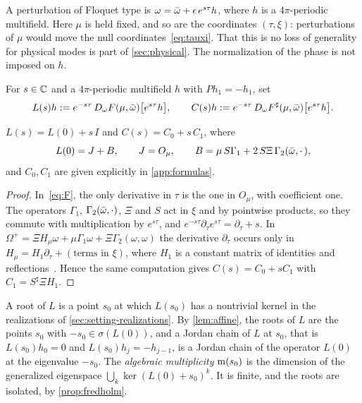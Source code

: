 A perturbation of Floquet type is $\omega=\bar\omega+\epsilon\,e^{s\tau}h$, where $h$ is a $4\pi$-periodic
multifield. Here $\mu$ is held fixed, and so are the coordinates $(\tau,\xi)$: perturbations of $\mu$ would
move the null coordinates~\eqref{eq:tauxi}. That this is no loss of generality for physical modes is part
of \cref{sec:physical}. The normalization of the phase is not imposed on $h$.

\begin{definition}\label{def:L}
For $s\in\mathbb{C}$ and a $4\pi$-periodic multifield $h$ with $Ph_1=-h_1$, set
\[
  L(s)h:=e^{-s\tau}\,D_\omega F(\mu,\bar\omega)\big[e^{s\tau}h\big],\qquad
  C(s)h:=e^{-s\tau}\,D_\omega F^\sharp(\mu,\bar\omega)\big[e^{s\tau}h\big].
\]
\end{definition}

\begin{lemma}\label{lem:affine}
$L(s)=L(0)+s\,I$ and $C(s)=C_0+s\,C_1$, where
\[
  L(0)=J+B,\qquad J=O_\mu,\qquad B=\mu\,S\Gamma_1+2\,S\Xi\,\Gamma_2(\bar\omega,\cdot\,),
\]
and $C_0,C_1$ are given explicitly in \cref{app:formulas}.
\end{lemma}

\begin{proof}
In~\eqref{eq:F}, the only derivative in $\tau$ is the one in $O_\mu$, with coefficient one. The operators
$\Gamma_1$, $\Gamma_2(\bar\omega,\cdot)$, $\Xi$ and $S$ act in $\xi$ and by pointwise products, so they
commute with multiplication by $e^{s\tau}$, and $e^{-s\tau}\partial_\tau e^{s\tau}=\partial_\tau+s$. In
$\Omega^+=\Xi H_\mu\omega+\mu\Gamma_1\omega+\Xi\Gamma_2(\omega,\omega)$ the derivative $\partial_\tau$ occurs
only in $H_\mu=H_1\partial_\tau+(\text{terms in }\xi)$, where $H_1$ is a constant matrix of identities and
reflections~\cite[\S\S2--3]{RT2019}. Hence the same computation gives $C(s)=C_0+sC_1$ with
$C_1=S^\sharp\Xi H_1$.
\end{proof}

A root of $L$ is a point $s_0$ at which $L(s_0)$ has a nontrivial kernel in the realizations of
\cref{sec:setting-realizations}. By \cref{lem:affine}, the roots of $L$ are the points $s_0$ with
$-s_0\in\sigma(L(0))$, and a Jordan chain of $L$ at $s_0$, that is $L(s_0)h_0=0$ and
$L(s_0)h_j=-h_{j-1}$, is a Jordan chain of the operator $L(0)$ at the eigenvalue $-s_0$. The
\emph{algebraic multiplicity} $\operatorname{m}(s_0)$ is the dimension of the generalized eigenspace
$\bigcup_k\ker(L(0)+s_0)^k$. It is finite, and the roots are isolated, by \cref{prop:fredholm}.

